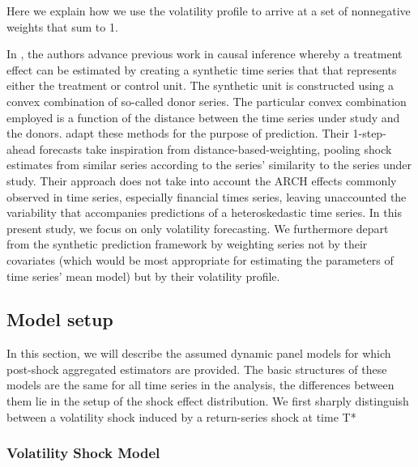 \documentclass[11pt]{article}
\theoremstyle{definition}
\begin{document}
Here we explain how we use the volatility profile to arrive at a set of nonnegative weights that sum to 1.

In \citet{abadie2010synthetic}, the authors advance previous work in causal inference whereby a treatment effect can be estimated by creating a synthetic time series that that represents either the treatment or control unit.  The synthetic unit is constructed using a convex combination of so-called donor series.  The particular convex combination employed is a function of the distance between the time series under study and the donors. \citet{lin2021minimizing} adapt these methods for the purpose of prediction.  Their 1-step-ahead forecasts take inspiration from distance-based-weighting, pooling shock estimates from similar series according to the series' similarity to the series under study.  Their approach does not take into account the ARCH effects commonly observed in time series, especially financial times series, leaving unaccounted the variability that accompanies predictions of a heteroskedastic time series.  In this present study, we focus on only volatility forecasting.  We furthermore depart from the synthetic prediction framework by weighting series not by their covariates (which would be most appropriate for estimating the parameters of time series' mean model) but by their volatility profile.


\subsection{Model setup}
\label{modelsetup}
In this section, we will describe the assumed dynamic panel models for which 
post-shock aggregated estimators are provided. The basic structures of these models 
are the same for all time series in the analysis, the differences between them lie in the setup of the shock effect distribution.  We first sharply distinguish between a volatility shock induced by a return-series shock at time T*




\subsubsection{Volatility Shock Model}
\end{document}
